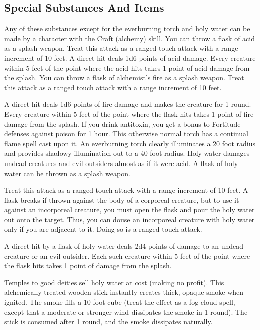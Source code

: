 \subsection{Special Substances And Items}
Any of these substances except for the everburning torch and holy water can be made by a character with the Craft (alchemy) skill.
 You can throw a flask of acid as a splash weapon. Treat this attack as a ranged touch attack with a range increment of 10 feet. A direct hit deals 1d6 points of acid damage. Every creature within 5 feet of the point where the acid hits takes 1 point of acid damage from the splash.
 You can throw a flask of alchemist's fire as a splash weapon. Treat this attack as a ranged touch attack with a range increment of 10 feet.
\par A direct hit deals 1d6 points of fire damage and makes the creature \ignited for 1 round. Every creature within 5 feet of the point where the flask hits takes 1 point of fire damage from the splash.
 If you drink antitoxin, you get a  bonus to Fortitude defenses against poison for 1 hour.
 This otherwise normal torch has a continual flame spell cast upon it. An everburning torch clearly illuminates a 20 foot radius and provides shadowy illumination out to a 40 foot radius.
 Holy water damages undead creatures and evil outsiders almost as if it were acid. A flask of holy water can be thrown as a splash weapon.
\par Treat this attack as a ranged touch attack with a range increment of 10 feet. A flask breaks if thrown against the body of a corporeal creature, but to use it against an incorporeal creature, you must open the flask and pour the holy water out onto the target. Thus, you can douse an incorporeal creature with holy water only if you are adjacent to it. Doing so is a ranged touch attack.
\par A direct hit by a flask of holy water deals 2d4 points of damage to an undead creature or an evil outsider. Each such creature within 5 feet of the point where the flask hits takes 1 point of damage from the splash.
\par Temples to good deities sell holy water at cost (making no profit).
 This alchemically treated wooden stick instantly creates thick, opaque smoke when ignited. The smoke fills a 10 foot cube (treat the effect as a fog cloud spell, except that a moderate or stronger wind dissipates the smoke in 1 round). The stick is consumed after 1 round, and the smoke dissipates naturally.
